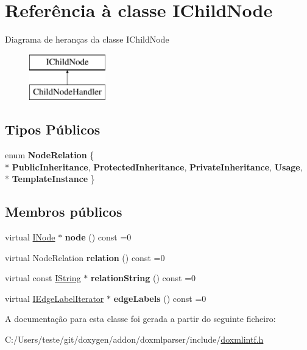 \hypertarget{class_i_child_node}{\section{Referência à classe I\-Child\-Node}
\label{class_i_child_node}
}
Diagrama de heranças da classe I\-Child\-Node\begin{figure}[H]
\begin{center}
\leavevmode
\includegraphics[height=2.000000cm]{class_i_child_node}
\end{center}
\end{figure}
\subsection*{Tipos Públicos}
\begin{DoxyCompactItemize}
\item 
enum {\bfseries Node\-Relation} \{ \\*
{\bfseries Public\-Inheritance}, 
{\bfseries Protected\-Inheritance}, 
{\bfseries Private\-Inheritance}, 
{\bfseries Usage}, 
\\*
{\bfseries Template\-Instance}
 \}
\end{DoxyCompactItemize}
\subsection*{Membros públicos}
\begin{DoxyCompactItemize}
\item 
\hypertarget{class_i_child_node_a1d498f9bd4f308f4af8b8ee1e3db11ea}{virtual \hyperlink{class_i_node}{I\-Node} $\ast$ {\bfseries node} () const =0}\label{class_i_child_node_a1d498f9bd4f308f4af8b8ee1e3db11ea}

\item 
\hypertarget{class_i_child_node_a2cdd6721bdfee15c1b713489b5665b3e}{virtual Node\-Relation {\bfseries relation} () const =0}\label{class_i_child_node_a2cdd6721bdfee15c1b713489b5665b3e}

\item 
\hypertarget{class_i_child_node_abf6319a14b7b3404f4fe3cfc3cbc6e06}{virtual const \hyperlink{class_i_string}{I\-String} $\ast$ {\bfseries relation\-String} () const =0}\label{class_i_child_node_abf6319a14b7b3404f4fe3cfc3cbc6e06}

\item 
\hypertarget{class_i_child_node_a5816ab9ede6fc06a279a1903abd47233}{virtual \hyperlink{class_i_edge_label_iterator}{I\-Edge\-Label\-Iterator} $\ast$ {\bfseries edge\-Labels} () const =0}\label{class_i_child_node_a5816ab9ede6fc06a279a1903abd47233}

\end{DoxyCompactItemize}


A documentação para esta classe foi gerada a partir do seguinte ficheiro\-:\begin{DoxyCompactItemize}
\item 
C\-:/\-Users/teste/git/doxygen/addon/doxmlparser/include/\hyperlink{include_2doxmlintf_8h}{doxmlintf.\-h}\end{DoxyCompactItemize}
